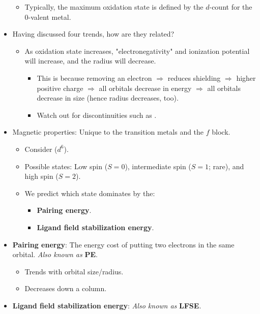 \documentclass[../notes.tex]{subfiles}
\begin{document}
\begin{itemize}
    \begin{itemize}
        \item Typically, the maximum oxidation state is defined by the $d$-count for the 0-valent metal.
    \end{itemize}
    \item Having discussed four trends, how are they related?
    \begin{itemize}
        \item As oxidation state increases, "electronegativity" and ionization potential will increase, and the radius will decrease.
        \begin{itemize}
            \item This is because removing an electron $\Rightarrow$ reduces shielding $\Rightarrow$ higher positive charge $\Rightarrow$ all orbitals decrease in energy $\Rightarrow$ all orbitals decrease in size (hence radius decreases, too).
            \item Watch out for discontinuities such as .
        \end{itemize}
    \end{itemize}
    \item Magnetic properties: Unique to the transition metals and the $f$ block.
    \begin{itemize}
        \item Consider  ($d^6$).
        \item Possible states: Low spin ($S=0$), intermediate spin ($S=1$; rare), and high spin ($S=2$).
        \item We predict which state dominates by the:
        \begin{itemize}
            \item \textbf{Pairing energy}.
            \item \textbf{Ligand field stabilization energy}.
        \end{itemize}
    \end{itemize}
    \item \textbf{Pairing energy}: The energy cost of putting two electrons in the same orbital. \emph{Also known as} \textbf{PE}.
    \begin{itemize}
        \item Trends with orbital size/radius.
        \item Decreases down a column.
    \end{itemize}
    \item \textbf{Ligand field stabilization energy}: \emph{Also known as} \textbf{LFSE}.

\end{itemize}
\end{document}
